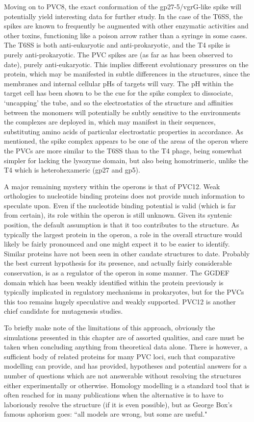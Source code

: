 Moving on to PVC8, the exact conformation of the gp27-5/vgrG-like spike will potentially yield interesting data for further study. In the case of the T6SS, the spikes are known to frequently be augmented with other enzymatic activities and other toxins, functioning like a poison arrow rather than a syringe in some cases. The T6SS is both anti-eukaryotic and anti-prokaryotic, and the T4 spike is purely anti-prokaryotic. The PVC spikes are (as far as has been observed to date), purely anti-eukaryotic. This implies different evolutionary pressures on the protein, which may be manifested in subtle differences in the structures, since the membranes and internal cellular pHs of targets will vary. The pH within the target cell has been shown to be the cue for the spike complex to dissociate, `uncapping' the tube, and so the electrostatics of the structure and affinities between the monomers will potentially be subtly sensitive to the environments the complexes are deployed in, which may manifest in their sequences, substituting amino acids of particular electrostatic properties in accordance. As mentioned, the spike complex appears to be one of the areas of the operon where the PVCs are more similar to the T6SS than to the T4 phage, being somewhat simpler for lacking the lysozyme domain, but also being homotrimeric, unlike the T4 which is heterohexameric (gp27 and gp5).

A major remaining mystery within the operons is that of PVC12. Weak orthologies to nucleotide binding proteins does not provide much information to speculate upon. Even if the nucleotide binding potential is valid (which is far from certain), its role within the operon is still unknown. Given its syntenic position, the default assumption is that it too contributes to the structure. As typically the largest protein in the operon, a role in the overall structure would likely be fairly pronounced and one might expect it to be easier to identify. Similar proteins have not been seen in other caudate structures to date. Probably the best current hypothesis for its presence, and actually fairly considerable conservation, is as a regulator of the operon in some manner. The GGDEF domain which has been weakly identified within the protein previously is typically implicated in regulatory mechanisms in prokaryotes, but for the PVCs this too remains hugely speculative and weakly supported. PVC12 is another chief candidate for mutagenesis studies.



To briefly make note of the limitations of this approach, obviously the simulations presented in this chapter are of assorted qualities, and care must be taken when concluding anything from theoretical data alone. There is however, a sufficient body of related proteins for many PVC loci, such that comparative modelling can provide, and has provided, hypotheses and potential answers for a number of questions which are not answerable without resolving the structures either experimentally or otherwise. Homology modelling is a standard tool that is often reached for in many publications when the alternative is to have to laboriously resolve the structure (if it is even possible), but as George Box's famous aphorism goes: ``all models are wrong, but some are useful."

